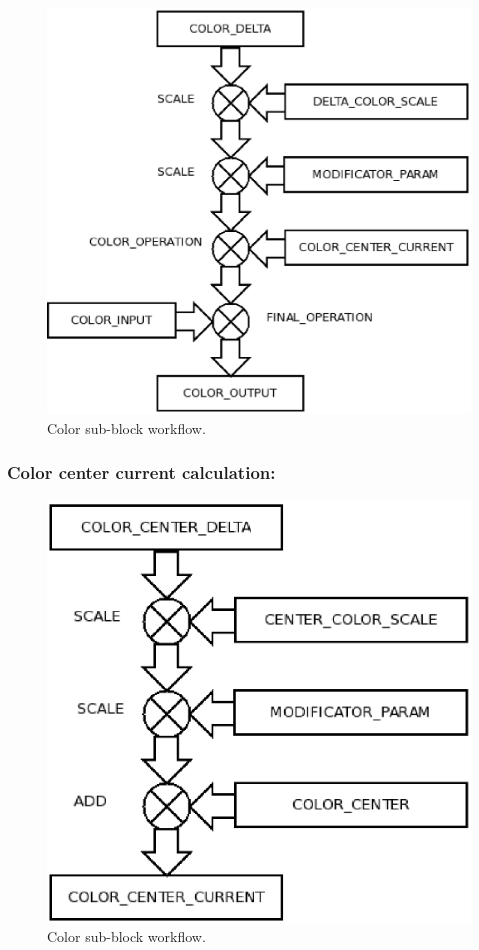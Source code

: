\documentclass[9pt]{article}
\begin{document}
\begin{figure}[h]
\begin{center}
  \includegraphics[scale=0.6]{p09.eps}
  \caption{Color sub-block workflow.}
  \label{rect_line_example}
\end{center}
\end{figure}

\subsubsection*{Color center current calculation:}

\begin{figure}[h]
\begin{center}
  \includegraphics[scale=0.6]{p10.eps}
  \caption{Color sub-block workflow.}
  \label{rect_line_example}
\end{center}
\end{figure}
\end{document}

